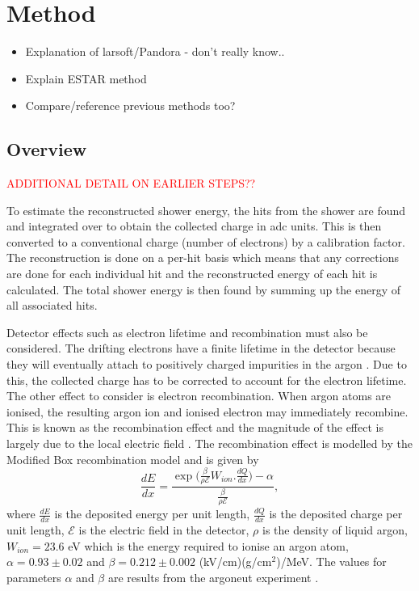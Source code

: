 \chapter{Method}
\label{chap:Method}

\begin{itemize}
    \item Explanation of larsoft/Pandora - don't really know..
    \item Explain ESTAR method \cite{ESTAR_Database}
    \item Compare/reference previous methods too? 
\end{itemize}

\section{Overview}

\textcolor{red}{ADDITIONAL DETAIL ON EARLIER STEPS??}

To estimate the reconstructed shower energy, the hits from the shower are found and integrated over to obtain the collected charge in \Gls{adc} units. This is then converted to a conventional charge (number of electrons) by a calibration factor. The reconstruction is done on a per-hit basis which means that any corrections are done for each individual hit and the reconstructed energy of each hit is calculated. The total shower energy is then found by summing up the energy of all associated hits. 

Detector effects such as electron lifetime and recombination must also be considered. The drifting electrons have a finite lifetime in the detector because they will eventually attach to positively charged impurities in the argon \cite{ArgoNeuT_electron_lifetime_paper}. Due to this, the collected charge has to be corrected to account for the electron lifetime. The other effect to consider is electron recombination. When argon atoms are ionised, the resulting argon ion and ionised electron may immediately recombine. This is known as the recombination effect and the magnitude of the effect is largely due to the local electric field \cite{ArgoNeuT_recombination_paper}. The recombination effect is modelled by the Modified Box recombination model and is given by
\begin{equation}\label{eqn:ModBox}
    \frac{dE}{dx} = \frac{\exp{(\frac{\beta}{\rho \mathcal{E}} W_{ion}.\frac{dQ}{dx}}) - \alpha}{\frac{\beta}{\rho \mathcal{E}}},
\end{equation}
where $\frac{dE}{dx}$ is the deposited energy per unit length, $\frac{dQ}{dx}$ is the deposited charge per unit length,  $\mathcal{E}$ is the electric field in the detector, $\rho$ is the density of liquid argon, $W_{ion} = 23.6$ eV which is the energy required to ionise an argon atom, $\alpha = 0.93 \pm 0.02$ and $\beta = 0.212 \pm 0.002$ (kV/cm)(g/cm$^2$)/MeV. The values for parameters $\alpha$ and $\beta$ are results from the \Gls{argoneut} experiment \cite{ArgoNeuT_recombination_paper}.

